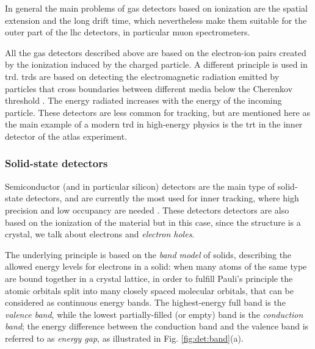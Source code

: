 In general the main problems of gas detectors based on ionization are the spatial extension and the long drift time, 
which nevertheless make them suitable for the outer part of the \gls{lhc} detectors, in particular muon spectrometers.

All the gas detectors described above are based on the electron-ion pairs created by the ionization induced by the charged particle. A different principle is used in \gls{trd}. \glspl{trd} are based on detecting the electromagnetic radiation emitted by particles that cross boundaries between different media below the Cherenkov threshold \cite{1402-4896-1982-T2A-024}. The energy radiated increases with the energy of the incoming particle. These detectors are less common for tracking, but are mentioned here as the main example of a modern \gls{trd} in high-energy physics is the \gls{trt} in the inner detector of the \gls{atlas} experiment.

\subsubsection*{Solid-state detectors}

Semiconductor (and in particular silicon) detectors are the main type of solid-state detectors, and are currently the most used for inner tracking, 
where high precision and low occupancy are needed \cite{Hartmann:2009zza}. 
These detectors detectors are also based on the ionization of the material but in this case, since the structure is a crystal, 
we talk about electrons and \textit{electron holes}. 

The underlying principle is based on the \textit{band model} of solids, describing the allowed energy levels for electrons in a solid: when many atoms of the same type are bound together in a crystal lattice, in order to fulfill Pauli's principle the atomic orbitals split into many closely spaced molecular orbitals, that can be considered as continuous energy bands. The highest-energy full band is the \textit{valence band}, while the lowest partially-filled (or empty) band is the \textit{conduction band}; the energy difference between the conduction band and the valence band is referred to as \textit{energy gap}, as illustrated in Fig. \ref{fig:det:band}(a). 


